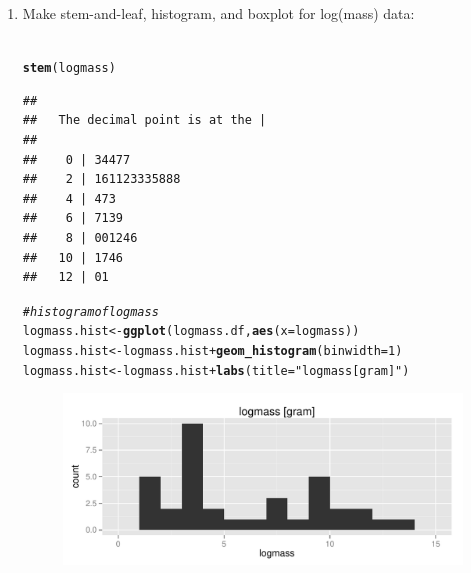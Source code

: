 \documentclass{article}\usepackage[]{graphicx}\usepackage[]{color}
\makeatletter
\def\maxwidth{ %
  \ifdim\Gin@nat@width>\linewidth
    \linewidth
  \else
    \Gin@nat@width
  \fi
}
\newcommand{\hlnum}[1]{\textcolor[rgb]{0.686,0.059,0.569}{#1}}%
\newcommand{\hlstr}[1]{\textcolor[rgb]{0.192,0.494,0.8}{#1}}%
\newcommand{\hlcom}[1]{\textcolor[rgb]{0.678,0.584,0.686}{\textit{#1}}}%
\newcommand{\hlopt}[1]{\textcolor[rgb]{0,0,0}{#1}}%
\newcommand{\hlstd}[1]{\textcolor[rgb]{0.345,0.345,0.345}{#1}}%
\newcommand{\hlkwb}[1]{\textcolor[rgb]{0.69,0.353,0.396}{#1}}%
\newcommand{\hlkwc}[1]{\textcolor[rgb]{0.333,0.667,0.333}{#1}}%
\newcommand{\hlkwd}[1]{\textcolor[rgb]{0.737,0.353,0.396}{\textbf{#1}}}%
\newenvironment{kframe}{%
 \def\at@end@of@kframe{}%
 \ifinner\ifhmode%
  \def\at@end@of@kframe{\end{minipage}}%
  \begin{minipage}{\columnwidth}%
 \fi\fi%
 \def\FrameCommand##1{\hskip\@totalleftmargin \hskip-\fboxsep
 \colorbox{shadecolor}{##1}\hskip-\fboxsep
     \hskip-\linewidth \hskip-\@totalleftmargin \hskip\columnwidth}%
 \MakeFramed {\advance\hsize-\width
   \@totalleftmargin\z@ \linewidth\hsize
   \@setminipage}}%
 {\par\unskip\endMakeFramed%
 \at@end@of@kframe}
\newenvironment{knitrout}{}{} %
\makeatother
\begin{document}
\begin{enumerate}
    \begin{enumerate}
      \item Make stem-and-leaf, histogram, and boxplot for log(mass) data: \\ \\
\begin{knitrout}
\color{fgcolor}\begin{kframe}
\begin{alltt}
\hlkwd{stem}\hlstd{(logmass)}
\end{alltt}
\begin{verbatim}
## 
##   The decimal point is at the |
## 
##    0 | 34477
##    2 | 161123335888
##    4 | 473
##    6 | 7139
##    8 | 001246
##   10 | 1746
##   12 | 01
\end{verbatim}
\end{kframe}
\end{knitrout}

\begin{knitrout}
\color{fgcolor}\begin{kframe}
\begin{alltt}
\hlcom{# histogram of logmass}
\hlstd{logmass.hist} \hlkwb{<-} \hlkwd{ggplot}\hlstd{(logmass.df,} \hlkwd{aes}\hlstd{(}\hlkwc{x} \hlstd{= logmass))}
\hlstd{logmass.hist} \hlkwb{<-} \hlstd{logmass.hist} \hlopt{+} \hlkwd{geom_histogram}\hlstd{(}\hlkwc{binwidth} \hlstd{=} \hlnum{1}\hlstd{)}
\hlstd{logmass.hist} \hlkwb{<-} \hlstd{logmass.hist} \hlopt{+} \hlkwd{labs}\hlstd{(}\hlkwc{title} \hlstd{=} \hlstr{"logmass [gram]"}\hlstd{)}
\end{alltt}
\end{kframe}
\end{knitrout}

\begin{figure}[H]  \begin{center}
\begin{knitrout}
\color{fgcolor}
\includegraphics[width=\maxwidth]{figure/4p_hist} 


\end{knitrout}
\end{center}
\end{figure}
\end{enumerate}
\end{enumerate}
\end{document}
